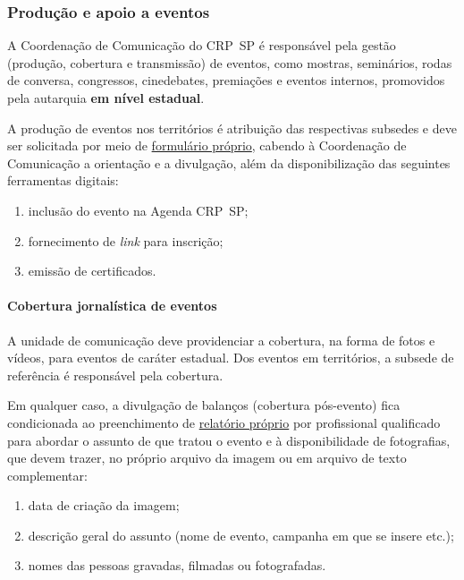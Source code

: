 \subsubsection{Produção e apoio a
  eventos}

A Coordenação de Comunicação do CRP~SP é responsável pela gestão
(produção, cobertura e transmissão) de eventos, como mostras,
seminários, rodas de conversa, congressos, cinedebates, premiações e
eventos internos, promovidos pela autarquia \textbf{em nível estadual}.

A produção de eventos nos territórios é atribuição das respectivas
subsedes e deve ser solicitada por meio de
\href{https://forms.gle/yFMCSwpP6DQ5p9dA6}{formulário próprio}, cabendo
à Coordenação de Comunicação a orientação e a divulgação, além da
disponibilização das seguintes ferramentas digitais:

\begin{enumerate}

  \item
        inclusão do evento na Agenda CRP~SP;
  \item
        fornecimento de \emph{link} para inscrição;
  \item
        emissão de certificados.
\end{enumerate}

\paragraph{Cobertura jornalística de
  eventos}

A unidade de comunicação deve providenciar a cobertura, na forma de
fotos e vídeos, para eventos de caráter estadual. Dos eventos em
territórios, a subsede de referência é responsável pela cobertura.

Em qualquer caso, a divulgação de balanços (cobertura pós-evento) fica
condicionada ao preenchimento de
\href{https://forms.gle/aZUAWsRiPbCLaaUL7}{relatório próprio} por
profissional qualificado para abordar o assunto de que tratou o evento e
à disponibilidade de fotografias, que devem trazer, no próprio arquivo
da imagem ou em arquivo de texto complementar:

\begin{enumerate}

  \item
        data de criação da imagem;
  \item
        descrição geral do assunto (nome de evento, campanha em que se insere
        etc.);
  \item
        nomes das pessoas gravadas, filmadas ou fotografadas.
\end{enumerate}

